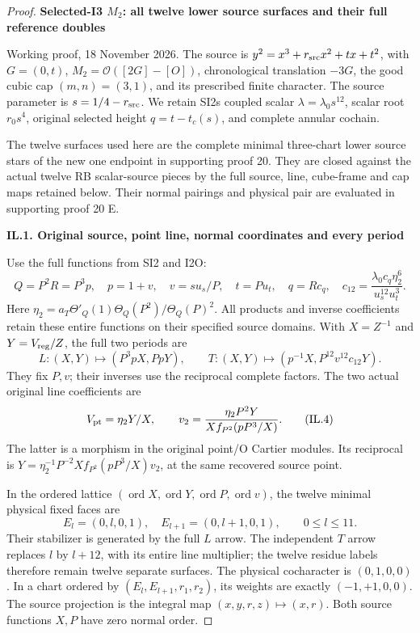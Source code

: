 \begin{proof}
\medskip\noindent\textbf{Selected-I3 \(M_{2}\): all twelve lower source surfaces and their full reference doubles}

\par\nobreak

Working proof, 18 November 2026. The source is
\(y^2=x^3+r_{\rm src}x^2+tx+t^2\), with \(G=(0,t)\),
\(M_2=\mathcal O([2G]-[O])\), chronological translation \(-3G\),
the good cubic cap \((m,n)=(3,1)\), and its prescribed finite character.
The source parameter is \(s=1/4-r_{\rm src}\). We retain SI2\textquotesingle s coupled
scalar \(\lambda=\lambda_0s^{12}\), scalar root \(r_0s^4\), original
selected height \(q=t-t_c(s)\), and complete annular cochain.

The twelve surfaces used here are the complete minimal three-chart
lower source stars of the new one endpoint in supporting proof 20.
They are closed against the actual twelve RB scalar-source pieces by
the full source, line, cube-frame and cap maps retained below.  Their
normal pairings and physical pair are evaluated in supporting proof 20 E.

\par

\medskip\noindent\textbf{IL.1. Original source, point line, normal coordinates and every period}

\par\nobreak

Use the full functions from SI2 and I2O:
\[
 Q=P^2R=P^3p,\quad p=1+v,\quad v=su_s/P,\quad
 t=Pu_t,\quad q=R c_q,\quad
 c_{12}=\frac{\lambda_0c_q\eta_2^6}{u_s^{12}u_t^3}.
 \tag{IL.2}
\]
Here
\(\eta_2=a_T\Theta'_Q(1)\Theta_Q(P^2)/\Theta_Q(P)^2\).
All products and inverse coefficients retain these entire functions
on their specified source domains. With \(X=Z^{-1}\) and
\(Y=V_{\rm reg}/Z\), the full two periods are
\[
 L:(X,Y)\longmapsto(P^3pX,PpY),\qquad
 T:(X,Y)\longmapsto(p^{-1}X,P^{12}v^{12}c_{12}Y).
 \tag{IL.3}
\]
They fix \(P,v\); their inverses use the reciprocal complete factors.
The two actual original line coefficients are
\[
 V_{\rm pt}=\eta_2Y/X,\qquad
 v_2=\frac{\eta_2P^2Y}{Xf_{P^2}(pP^3/X)}.
 \tag{IL.4}
\]
The latter is a morphism in the original point/O Cartier modules.
Its reciprocal is \(Y=\eta_2^{-1}P^{-2}X
f_{P^2}(pP^3/X)v_2\), at the same recovered source point.

In the ordered lattice
\((\operatorname{ord}X,\operatorname{ord}Y,
\operatorname{ord}P,\operatorname{ord}v)\), the twelve minimal
physical fixed faces are
\[
 E_l=(0,l,0,1),\quad E_{l+1}=(0,l+1,0,1),
                  \qquad 0\leq l\leq11.
 \tag{IL.5}
\]
Their stabilizer is generated by the full \(L\) arrow. The independent
\(T\) arrow replaces \(l\) by \(l+12\), with its entire line multiplier;
the twelve residue labels therefore remain twelve separate surfaces.
The physical cocharacter is \((0,1,0,0)\). In a chart ordered by
\((E_l,E_{l+1},r_1,r_2)\), its weights are exactly \((-1,+1,0,0)\).
The source projection is the integral map
\((x,y,r,z)\mapsto(x,r)\). Both source functions \(X,P\) have zero
normal order.


\end{proof}
